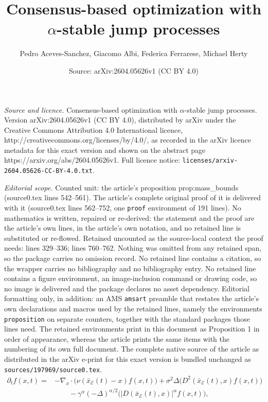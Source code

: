 \documentclass[10pt,a4paper]{amsart}
\title{Consensus-based optimization with $\alpha$-stable jump processes}
\author{Pedro Aceves-Sanchez, Giacomo Albi, Federica Ferrarese, Michael Herty}
\date{Source: arXiv:2604.05626v1 (CC BY 4.0)}
\begin{document}
\maketitle

\noindent\emph{Source and licence.} Consensus-based optimization with $\alpha$-stable jump processes. Version arXiv:2604.05626v1 (CC BY 4.0), distributed by arXiv under the Creative Commons Attribution 4.0 International licence, http://creativecommons.org/licenses/by/4.0/, as recorded in the arXiv licence metadata for this exact version and shown on the abstract page https://arxiv.org/abs/2604.05626v1. Full licence notice: \texttt{licenses/arxiv-2604.05626-CC-BY-4.0.txt}.\par\smallskip

\noindent\textit{Editorial scope.} Counted unit: the article's proposition prop:mass\_bounds (source0.tex lines 542--561). The article's complete original proof of it is delivered with it (source0.tex lines 562--752, one \texttt{proof} environment of 191 lines). No mathematics is written, repaired or re-derived: the statement and the proof are the article's own lines, in the article's own notation, and no retained line is substituted or re-flowed.  Retained uncounted as the source-local context the proof needs: lines 329--336; lines 760--762.  Nothing was omitted from any retained span, so the package carries no omission record.  No retained line contains a citation, so the wrapper carries no bibliography and no bibliography entry.  No retained line contains a figure environment, an image-inclusion command or drawing code, so no image is delivered and the package declares no asset dependency.  Editorial formatting only, in addition: an AMS \texttt{amsart} preamble that restates the article's own declarations and macros used by the retained lines, namely the environments \texttt{proposition} on separate counters, together with the standard packages those lines need.  The retained environments print in this document as Proposition 1 in order of appearance, whereas the article prints the same items with the numbering of its own full document.  The complete native source of the article as distributed in the arXiv e-print for this exact version is bundled unchanged as \texttt{sources/197969/source0.tex}.
\begin{equation}\label{eq:fFP}
	\begin{aligned}
		\partial_t f(x,t) = 
		& - \nabla_x \cdot \big(\nu(\bar{x}_\mathcal{E}(t)-x) f(x,t)\big) + \sigma^2 \Delta\big(D^2(\bar{x}_\mathcal{E}(t),x) f(x,t)\big) \\
		& 
		\qquad - \gamma^{\alpha} (-\Delta)^{\alpha/2}\big(|D(\bar{x}_\mathcal{E}(t),x)|^\alpha f(x,t)\big),
	\end{aligned}
\end{equation}
\end{document}
